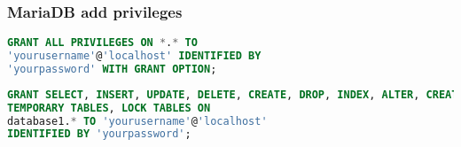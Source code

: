 \begin{frame}[fragile]
        \frametitle{MariaDB add privileges}

\begin{lstlisting}[language=sql]
GRANT ALL PRIVILEGES ON *.* TO
'yourusername'@'localhost' IDENTIFIED BY
'yourpassword' WITH GRANT OPTION;
\end{lstlisting}

\begin{lstlisting}[language=sql]
GRANT SELECT, INSERT, UPDATE, DELETE, CREATE, DROP, INDEX, ALTER, CREATE
TEMPORARY TABLES, LOCK TABLES ON
database1.* TO 'yourusername'@'localhost'
IDENTIFIED BY 'yourpassword';
\end{lstlisting}

\end{frame}

